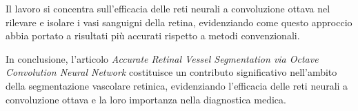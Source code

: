 Il lavoro si concentra sull'efficacia delle reti neurali a convoluzione ottava
nel rilevare e isolare i vasi sanguigni della retina, evidenziando come questo
approccio abbia portato a risultati più accurati rispetto a metodi
convenzionali.

In conclusione, l'articolo \textit{Accurate Retinal Vessel Segmentation via
Octave Convolution Neural Network} costituisce un contributo significativo
nell'ambito della segmentazione vascolare retinica, evidenziando l'efficacia
delle reti neurali a convoluzione ottava e la loro importanza nella diagnostica
medica.

